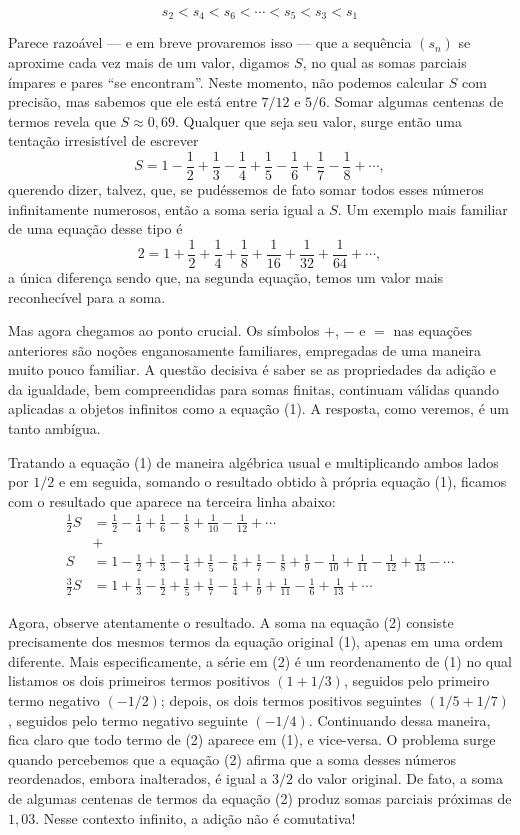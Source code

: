 \[
s_2 < s_4 < s_6 < \cdots < s_5 < s_3 < s_1
\]

Parece razoável --- e em breve provaremos isso --- que a sequência $(s_n)$ se aproxime cada vez mais de um valor, digamos $S$, no qual as somas parciais ímpares e pares ``se encontram''. Neste momento, não podemos calcular $S$ com precisão, mas sabemos que ele está entre $7/12$ e $5/6$. Somar algumas centenas de termos revela que $S\approx 0{,}69$. Qualquer que seja seu valor, surge então uma tentação irresistível de escrever 
\[
\tag{1}
S=1-\frac{1}{2}+\frac{1}{3}-\frac{1}{4}+\frac{1}{5}-\frac{1}{6}+\frac{1}{7}-\frac{1}{8}+\cdots,
\]
querendo dizer, talvez, que, se pudéssemos de fato somar todos esses números infinitamente numerosos, então a soma seria igual a $S$. Um exemplo mais familiar de uma equação desse tipo é
\[
2=1+\frac{1}{2}+\frac{1}{4}+\frac{1}{8}+\frac{1}{16}+\frac{1}{32}+\frac{1}{64}+\cdots,
\]
a única diferença sendo que, na segunda equação, temos um valor mais reconhecível para a soma.

Mas agora chegamos ao ponto crucial. Os símbolos $+$, $-$ e $=$ nas equações anteriores são noções enganosamente familiares, empregadas de uma maneira muito pouco familiar. A questão decisiva é saber se as propriedades da adição e da igualdade, bem compreendidas para somas finitas, continuam válidas quando aplicadas a objetos infinitos como a equação (1). A resposta, como veremos, é um tanto ambígua.

Tratando a equação (1) de maneira algébrica usual e multiplicando ambos
lados por $1/2$ e em seguida, somando o resultado obtido à própria equação (1), ficamos com o 
resultado que aparece na terceira linha abaixo:
\begin{align}
 \frac{1}{2}S &= \frac{1}{2}-\frac{1}{4}+\frac{1}{6}-\frac{1}{8}+\frac{1}{10}-\frac{1}{12}+\cdots 
 \nonumber\\[0.1cm]
 &+
 \nonumber\\[0.1cm]
 S\phantom{0} &= 1-\frac{1}{2}+\frac{1}{3}-\frac{1}{4}+\frac{1}{5}-
 \frac{1}{6}+\frac{1}{7}-\frac{1}{8}+\frac{1}{9}-\frac{1}{10}
 +\frac{1}{11}-\frac{1}{12}+\frac{1}{13}-\cdots 
\nonumber\\[0.6cm]
{}
\frac{3}{2}S &= 1+\frac{1}{3}-\frac{1}{2}+\frac{1}{5}+\frac{1}{7}-\frac{1}{4}+\frac{1}{9}+\frac{1}{11}-\frac{1}{6}+\frac{1}{13}+\cdots
\tag{2}
\end{align}

Agora, observe atentamente o resultado. A soma na equação (2) consiste precisamente dos mesmos termos da equação original (1), apenas em uma ordem diferente. Mais especificamente, a série em (2) é um reordenamento de (1) no qual listamos os dois primeiros termos positivos $(1+1/3)$, seguidos pelo primeiro termo negativo $(-1/2)$; depois, os dois termos positivos seguintes $(1/5+1/7)$, seguidos pelo termo negativo seguinte $(-1/4)$. Continuando dessa maneira, fica claro que todo termo de (2) aparece em (1), e vice-versa. O problema surge quando percebemos que a equação (2) afirma que a soma desses números reordenados, embora inalterados, é igual a $3/2$ do valor original. De fato, a soma de algumas centenas de termos da equação (2) produz somas parciais próximas de $1{,}03$. Nesse contexto infinito, a adição não é comutativa! 

